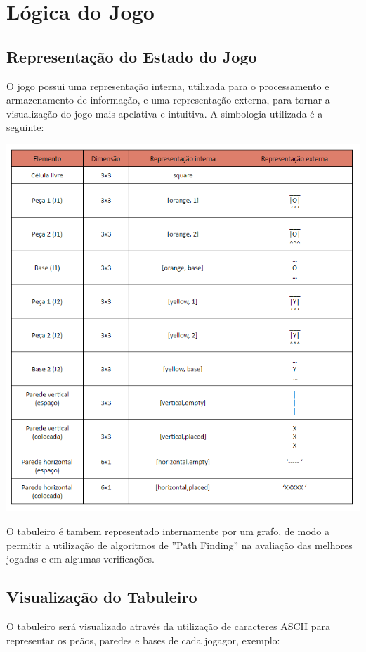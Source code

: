 \documentclass[a4paper]{article}
\begin{document}
\section{Lógica do Jogo}


\subsection{Representação do Estado do Jogo} 

O jogo possui uma representação interna, utilizada para o processamento e armazenamento de informação, e uma representação externa, para tornar a visualização do jogo mais apelativa e intuitiva. A simbologia utilizada é a seguinte: 


\begin{center}
\includegraphics[scale = 0.7]{fig3.png}
\end{center}

O tabuleiro é tambem representado internamente por um grafo, de modo a permitir a utilização de algoritmos de  ''Path Finding'' na avaliação das melhores jogadas e em algumas verificações.

\newpage
\subsection{Visualização do Tabuleiro} 
O tabuleiro será visualizado através da utilização de caracteres ASCII para representar os peãos, paredes e bases de cada jogagor, exemplo:
\end{document}
